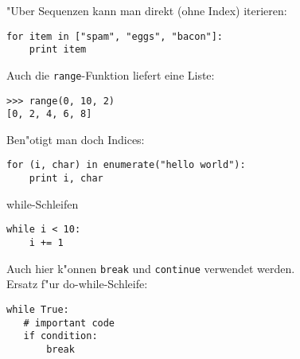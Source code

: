 \begin{frame}[fragile]
"Uber Sequenzen kann man direkt (ohne Index) iterieren:
\begin{lstlisting}[style=Python]
for item in ["spam", "eggs", "bacon"]:
    print item
\end{lstlisting}

Auch die \texttt{range}-Funktion liefert eine Liste:
\begin{lstlisting}[style=Shell]
>>> range(0, 10, 2)
[0, 2, 4, 6, 8]
\end{lstlisting}
Ben"otigt man doch Indices:
\begin{lstlisting}[style=Python]
for (i, char) in enumerate("hello world"):
    print i, char
\end{lstlisting}
\end{frame}

\begin{frame}[fragile]{while-Schleifen}
\begin{lstlisting}[style=Python]
while i < 10:
    i += 1
\end{lstlisting}
Auch hier k"onnen \lstinline{break} und \lstinline{continue} verwendet werden.\\[3mm]
Ersatz f"ur do-while-Schleife:
\begin{lstlisting}[style=Python]
while True:
   # important code
   if condition:
       break
\end{lstlisting} 
\end{frame}

